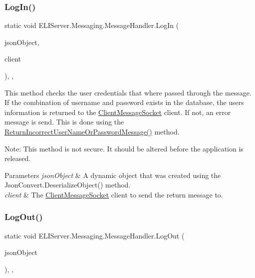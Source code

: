 \subsubsection{\texorpdfstring{Log\+In()}{LogIn()}}
{\footnotesize\ttfamily static void E\+L\+I\+Server.\+Messaging.\+Message\+Handler.\+Log\+In (\begin{DoxyParamCaption}\item[{dynamic}]{json\+Object,  }\item[{\hyperlink{class_e_l_i_server_1_1_messaging_1_1_client_message_socket}{Client\+Message\+Socket}}]{client }\end{DoxyParamCaption})\hspace{0.3cm}{\ttfamily [inline]}, {\ttfamily [static]}, {\ttfamily [private]}}



This method checks the user credentials that where passed through the message. If the combination of username and password exists in the database, the users information is returned to the \hyperlink{class_e_l_i_server_1_1_messaging_1_1_client_message_socket}{Client\+Message\+Socket} client. If not, an error message is send. This is done using the \hyperlink{class_e_l_i_server_1_1_messaging_1_1_message_handler_a9594cb08cdb01a3ae81e0e794447ff9c}{Return\+Incorrect\+User\+Name\+Or\+Password\+Message()} method. 

Note\+: This method is not secure. It should be altered before the application is released. 


\begin{DoxyParams}{Parameters}
{\em json\+Object} & A dynamic object that was created using the Json\+Convert.\+Deserialize\+Object() method.\\
\hline
{\em client} & The \hyperlink{class_e_l_i_server_1_1_messaging_1_1_client_message_socket}{Client\+Message\+Socket} client to send the return message to.\\
\hline
\end{DoxyParams}
\mbox{\label{class_e_l_i_server_1_1_messaging_1_1_message_handler_a1fe43aa94ee3e3d03fcf147549eabced}} 
\subsubsection{\texorpdfstring{Log\+Out()}{LogOut()}}
{\footnotesize\ttfamily static void E\+L\+I\+Server.\+Messaging.\+Message\+Handler.\+Log\+Out (\begin{DoxyParamCaption}\item[{dynamic}]{json\+Object }\end{DoxyParamCaption})\hspace{0.3cm}{\ttfamily [inline]}, {\ttfamily [static]}, {\ttfamily [private]}}



